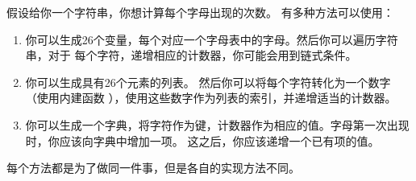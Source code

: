 
假设给你一个字符串，你想计算每个字母出现的次数。
有多种方法可以使用：


\begin{enumerate}

\item 你可以生成26个变量，每个对应一个字母表中的字母。然后你可以遍历字符串，对于 每个字符，递增相应的计数器，你可能会用到链式条件。

\item 你可以生成具有26个元素的列表。 然后你可以将每个字符转化为一个数字（使用内建函数  ），使用这些数字作为列表的索引，并递增适当的计数器。

\item 你可以生成一个字典，将字符作为键，计数器作为相应的值。字母第一次出现时，你应该向字典中增加一项。 这之后，你应该递增一个已有项的值。

\end{enumerate}


每个方法都是为了做同一件事，但是各自的实现方法不同。



